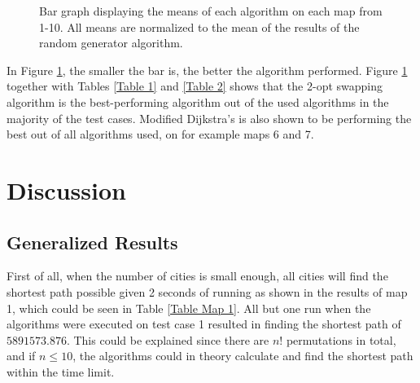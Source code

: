 \documentclass{article}
\begin{document}
\begin{figure}[H]
\caption{Bar graph displaying the means of each algorithm on each map from 1-10. All means are normalized to the mean of the results of the random generator algorithm.} \label{MeanDiagram}
\end{figure}

\noindent
In Figure \ref{MeanDiagram}, the smaller the bar is, the better the algorithm performed. Figure \ref{MeanDiagram} together with Tables \ref{Table 1} and \ref{Table 2} shows that the 2-opt swapping algorithm is the best-performing algorithm out of the used algorithms in the majority of the test cases. Modified Dijkstra's is also shown to be performing the best out of all algorithms used, on for example maps 6 and 7. 


\section{Discussion}\label{sec4}

\subsection{Generalized Results}\label{subsec1}
First of all, when the number of cities is small enough, all cities will find the shortest path possible given 2 seconds of running as shown in the results of map 1, which could be seen in Table \ref{Table Map 1}. All but one run when the algorithms were executed on test case 1 resulted in finding the shortest path of $5891573.876$. This could be explained since there are $n!$ permutations in total, and if $n\leq 10$, the algorithms could in theory calculate and find the shortest path within the time limit.
\end{document}
